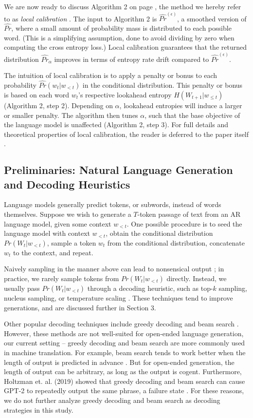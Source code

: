 \documentclass[pageno]{jpaper}
\begin{document}
We are now ready to discuss Algorithm 2 on page \pageref{Alg2}, the method we hereby refer to as \textit{local calibration} \cite{Braverman}. The input to Algorithm 2 is $\widehat{Pr}^{(\epsilon)}$, a smoothed version of $\widehat{Pr}$, where a small amount of probability mass is distributed to each possible word. (This is a simplifying assumption, done to avoid dividing by zero when computing the cross entropy loss.) Local calibration guarantees that the returned distribution $\widehat{Pr}_\alpha$ improves in terms of entropy rate drift compared to $\widehat{Pr}^{(\epsilon)}$.

The intuition of local calibration is to apply a penalty or bonus to each probability $\widehat{Pr}(w_t | w_{<t})$ in the conditional distribution. This penalty or bonus is based on each word $w_t$'s respective lookahead entropy $H(W_{t+1} | w_{\leq t})$ (Algorithm 2, step 2). Depending on $\alpha$, lookahead entropies will induce a larger or smaller penalty. The algorithm then tunes $\alpha$, such that the base objective of the language model is unaffected (Algorithm 2, step 3). For full details and theoretical properties of local calibration, the reader is deferred to the paper itself \cite{Braverman}.

\subsection{Preliminaries: Natural Language Generation and Decoding Heuristics}

Language models generally predict tokens, or subwords, instead of words themselves. Suppose we wish to generate a $T$-token passage of text from an AR language model, given some context $w_{<t}$. One possible procedure is to seed the language model with context $w_{<t}$, obtain the conditional distribution $Pr(W_t|w_{<t})$, sample a token $w_t$ from the conditional distribution, concatenate $w_t$ to the context, and repeat. 

Naively sampling in the manner above can lead to nonsensical output \cite{holtzman2019curious}; in practice, we rarely sample tokens from $Pr(W_t|w_{<t})$ directly. Instead, we usually pass $Pr(W_t|w_{<t})$ through a decoding heuristic, such as top-$k$ sampling, nucleus sampling, or temperature scaling \cite{radford2019language,holtzman2019curious,guoTempCalibration}. These techniques tend to improve generations, and are discussed further in Section 3.

Other popular decoding techniques include greedy decoding and beam search \cite{greedyBeam}. However, these methods are not well-suited for open-ended language generation, our current setting -- greedy decoding and beam search are more commonly used in machine translation. For example, beam search tends to work better when the length of output is predicted in advance \cite{beam-search-length}. But for open-ended generation, the length of output can be arbitrary, as long as the output is cogent. Furthermore, Holtzman et. al. (2019) showed that greedy decoding and beam search can cause GPT-2 to repeatedly output the same phrase, a failure state \cite{holtzman2019curious}. For these reasons, we do not further analyze greedy decoding and beam search as decoding strategies in this study.
\end{document}
